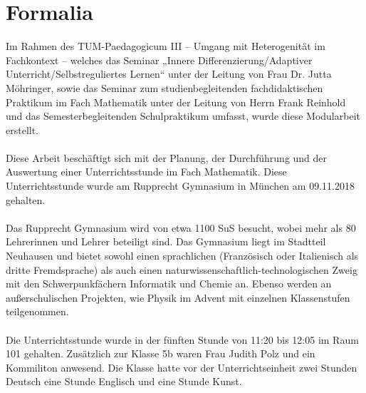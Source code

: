 \chapter{Formalia}
Im Rahmen des TUM-Paedagogicum III – Umgang mit Heterogenität im Fachkontext –
welches das Seminar „Innere Differenzierung/Adaptiver Unterricht/Selbstreguliertes Lernen“
unter der Leitung von Frau Dr. Jutta Möhringer, sowie das Seminar zum studienbegleitenden
fachdidaktischen Praktikum im Fach Mathematik unter der Leitung von Herrn Frank Reinhold
und das Semesterbegleitenden Schulpraktikum umfasst, wurde diese Modularbeit erstellt.
\\
\\
Diese Arbeit beschäftigt sich mit der Planung, der Durchführung und der Auswertung einer Unterrichtsstunde im Fach Mathematik. Diese Unterrichtsstunde wurde am Rupprecht Gymnasium in München am 09.11.2018 gehalten.
\\
\\
Das Rupprecht Gymnasium wird von etwa 1100 SuS besucht, wobei mehr als 80 Lehrerinnen und Lehrer beteiligt sind. Das Gymnasium liegt im Stadtteil Neuhausen und bietet sowohl einen sprachlichen (Französisch oder Italienisch als dritte Fremdsprache) als auch einen naturwissenschaftlich-technologischen Zweig mit den Schwerpunkfächern Informatik und Chemie an. Ebenso werden an außerschulischen Projekten, wie Physik im Advent mit einzelnen Klassenstufen teilgenommen.
\\
\\
Die Unterrichtsstunde wurde in der fünften Stunde von 11:20 bis 12:05 im Raum 101 gehalten. Zusätzlich zur Klasse 5b waren Frau Judith Polz und ein Kommiliton anwesend. Die Klasse hatte vor der Unterrichtseinheit zwei Stunden Deutsch eine Stunde Englisch und eine Stunde Kunst.